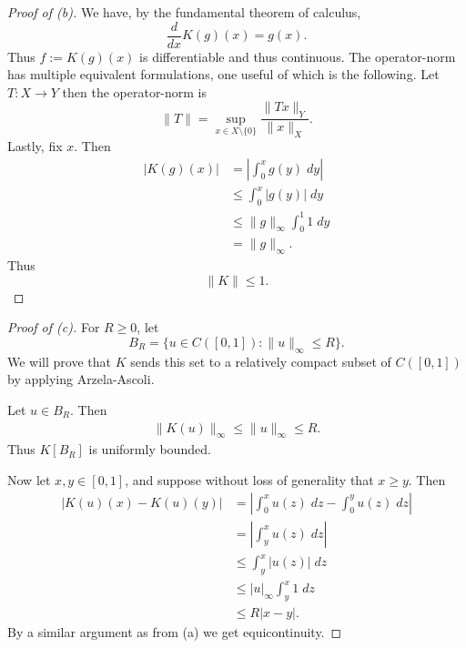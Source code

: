 \begin{proof}[Proof of (b)]
    We have, by the fundamental theorem of calculus, 
    \[
        \frac{d}{dx} K(g)(x) = g(x). 
    \]
    Thus $f := K(g)(x)$ is differentiable and thus continuous. 
    The operator-norm has multiple equivalent formulations, one 
    useful of which is the following. 
    Let $T : X \to Y$ then the operator-norm is 
    \[
        \|T\| = \sup_{x \in X\setminus\{0\}}\frac{\|Tx\|_Y}{\|x\|_X}.
    \]
    Lastly, fix $x$. Then 
    \begin{align*}
        |K(g)(x)|
        &= \left|\int_0^x g(y) \; dy\right| \\ 
        &\leq \int_0^x |g(y)| \; dy \\ 
        &\leq \|g\|_\infty \int_0^1 1 \; dy \\ 
        &= \|g\|_\infty. 
    \end{align*} 
    Thus 
    \[
        \|K\| \leq 1.
    \]
\end{proof}
\begin{proof}[Proof of (c)]
    For $R \geq 0$, let 
    \[
        B_R = \{u \in C([0,1]) : \|u\|_\infty \leq R\}.
    \]
    We will prove that $K$ sends this set to a relatively compact 
    subset of $C([0,1])$ by applying Arzela-Ascoli.

    Let $u \in B_R$.
    Then 
    \begin{align*}
        \|K(u)\|_\infty \leq \|u\|_\infty \leq R.   
    \end{align*}
    Thus $K[B_R]$ is uniformly bounded. 

    Now let $x,y \in [0,1]$, and suppose without loss 
    of generality that 
    $x \geq y$. Then 
    \begin{align*}
        |K(u)(x) - K(u)(y)|
        &= \left|\int_0^x u(z) \; dz - \int_0^y u(z) \; dz\right| \\
        &= \left|\int_y^x u(z) \; dz\right| \\
        &\leq \int_y^x |u(z)| \; dz \\
        &\leq |u|_\infty \int_y^x 1 \; dz \\
        &\leq R |x - y|.
    \end{align*}
    By a similar argument as from (a) we get equicontinuity. 
\end{proof}



